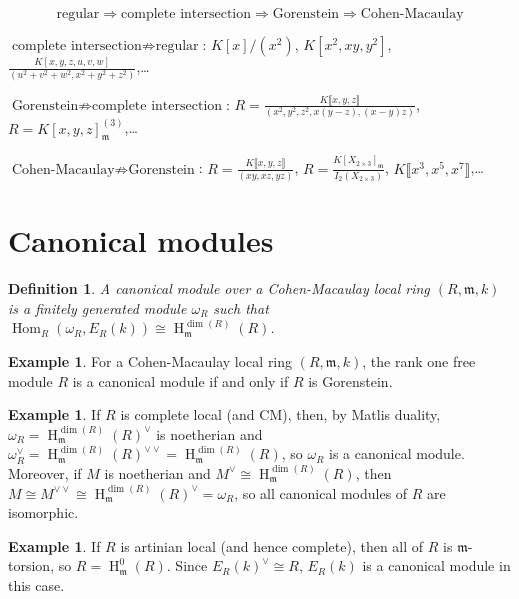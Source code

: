 \documentclass[11pt]{book}
\newtheorem{definition}[theorem]{Definition}
\numberwithin{equation}{section}
\numberwithin{theorem}{chapter}
\theoremstyle{definition}
\newtheorem{example}[theorem]{Example}
\newtheorem*{basic properties}{Basic Properties}
\newtheorem*{Important Remark}{Important Remark}
\theoremstyle{remark}
\newcommand{\m}{\mathfrak{m}}
\newcommand{\Hom}{\operatorname{Hom}}
\renewcommand{\dim}{\operatorname{dim}}
\renewcommand{\H}{\operatorname{H}}
\begin{document}
\[ \text{regular} \Rightarrow \text{complete intersection} \Rightarrow \text{Gorenstein} \Rightarrow \text{Cohen-Macaulay}\]

\noindent$\text{complete intersection} \not\Rightarrow \text{regular}$: $K[x]/(x^2)$, $K[x^2,xy,y^2]$, $\frac{K[x,y,z,u,v,w]}{(u^2+v^2+w^2,x^2+y^2+z^2)}$,\dots

\noindent$\text{Gorenstein} \not\Rightarrow \text{complete intersection}$:  $R=\frac{K\llbracket x,y,z \rrbracket}{(x^2,y^2,z^2,x(y-z),(x-y)z)}$, $R=K[x,y,z]^{(3)}_{\m}$,\dots

\noindent$\text{Cohen-Macaulay} \not\Rightarrow \text{Gorenstein}$: $R=\frac{K\llbracket x,y,z \rrbracket}{(xy,xz,yz)}$, $R=\frac{K[X_{2\times 3}]_{\m}}{I_2(X_{2\times 3})}$, $K\llbracket x^3, x^5, x^7 \rrbracket$,\dots


\section{Canonical modules}

\begin{definition} A \emph{canonical module} over a Cohen-Macaulay local ring $(R,\m,k)$ is a finitely generated module $\omega_R$ such that $\Hom_R(\omega_R,E_R(k)) \cong \H^{\dim(R)}_\m (R)$.
\end{definition}

\begin{example}
 For a Cohen-Macaulay local ring $(R,\m,k)$, the rank one free module $R$ is a canonical module if and only if $R$ is Gorenstein.
 \end{example}

\begin{example}
	If $R$ is complete local (and CM), then, by Matlis duality, $\omega_R=\H^{\dim(R)}_{\m}(R)^\vee$ is noetherian and $\omega_R^\vee=\H^{\dim(R)}_{\m}(R)^{\vee\vee}=\H^{\dim(R)}_{\m}(R)$, so $\omega_R$ is a canonical module. Moreover, if $M$ is noetherian and $M^\vee\cong \H^{\dim(R)}_{\m}(R)$, then $M\cong M^{\vee\vee}\cong \H^{\dim(R)}_{\m}(R)^\vee = \omega_R$, so all canonical modules of $R$ are isomorphic.
\end{example}

\begin{example}
	If $R$ is artinian local (and hence complete), then all of $R$ is $\m$-torsion, so $R=\H^0_\m(R)$. Since $E_R(k)^{\vee}\cong R$, $E_R(k)$ is a canonical module in this case.
\end{example}
\end{document}
